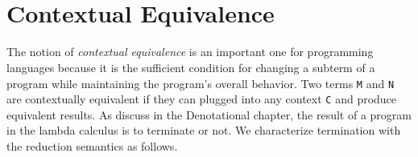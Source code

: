 \begin{fence}
\begin{code}
\AgdaSpace{}%
\AgdaSpace{}%
\AgdaSpace{}%
\AgdaSymbol{(}\AgdaSymbol{;}\AgdaSpace{}%
\AgdaSymbol{;}\AgdaSpace{}%
\AgdaSymbol{)}\<%
\\
\>[0]\AgdaSpace{}%
\AgdaSpace{}%
\AgdaSpace{}%
\AgdaSpace{}%
\AgdaSymbol{(}\AgdaSymbol{)}\<%
\\
\>[0]\AgdaSpace{}%
\AgdaSpace{}%
\AgdaSpace{}%
\AgdaSpace{}%
\AgdaSymbol{(}\AgdaSymbol{)}\<%
\end{code}
\end{fence}

\hypertarget{contextual-equivalence}{%
\section{Contextual Equivalence}\label{contextual-equivalence}}

The notion of \emph{contextual equivalence} is an important one for
programming languages because it is the sufficient condition for
changing a subterm of a program while maintaining the program's overall
behavior. Two terms \texttt{M} and \texttt{N} are contextually
equivalent if they can plugged into any context \texttt{C} and produce
equivalent results. As discuss in the Denotational chapter, the result
of a program in the lambda calculus is to terminate or not. We
characterize termination with the reduction semantics as follows.

\begin{fence}
\begin{code}%
\>[0]\AgdaSpace{}%
\AgdaSymbol{:}\AgdaSpace{}%
\AgdaSymbol{\}}\AgdaSpace{}%
\AgdaSpace{}%
\AgdaSymbol{(}\AgdaSpace{}%
\AgdaSymbol{:}\AgdaSpace{}%
\AgdaSpace{}%
\AgdaSpace{}%
\AgdaSymbol{)}\AgdaSpace{}%
\AgdaSpace{}%
\<%
\\
\>[0]\AgdaSpace{}%
\AgdaSymbol{\{}\AgdaSymbol{\}}\AgdaSpace{}%
\AgdaSpace{}%
\AgdaSymbol{=}\AgdaSpace{}%
\AgdaFunction{Σ[}\AgdaSpace{}%
\AgdaSpace{}%
\AgdaSpace{}%
\AgdaSymbol{(}\AgdaSpace{}%
\AgdaOperator{\AgdaInductiveConstructor{,}}\AgdaSpace{}%
\AgdaSpace{}%
\AgdaSpace{}%
\AgdaSymbol{)}\AgdaSpace{}%
\AgdaFunction{]}\AgdaSpace{}%
\AgdaSymbol{(}\AgdaSpace{}%
\AgdaSpace{}%
\AgdaSpace{}%
\AgdaSymbol{)}\<%
\end{code}
\end{fence}

